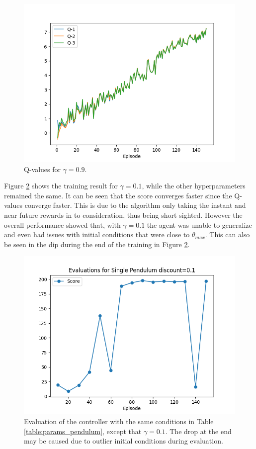 \documentclass{LTHtwocol} %
\begin{document}
\begin{figure}[H]
	\centering
	\includegraphics[width=0.9\columnwidth]{figures/Pendulum_q_gamma_09.png}
	\caption{Q-values for $\gamma=0.9$.}
	\label{fig:pendulum_gamma_09}
\end{figure}

Figure \ref{fig:single_pendulum_eval_01} shows the training result for $\gamma=0.1$, while the other hyperparameters remained the same. It can be seen that the score converges faster since the Q-values converge faster. This is due to the algorithm only taking the instant and near future rewards in to consideration, thus being short sighted. However the overall performance showed that, with $\gamma=0.1$ the agent was unable to generalize and even had issues with initial conditions that were close to $\theta_{max}$. This can also be seen in the dip during the end of the training in Figure \ref{fig:single_pendulum_eval_01}.
\begin{figure}[H]
	\centering
	\includegraphics[width=0.9\columnwidth]{figures/pendulum_gamma_01.png}
	\caption{Evaluation of the controller with the same conditions in Table \ref{table:params_pendulum}, except that $\gamma=0.1$. The drop at the end may be caused due to outlier initial conditions during evaluation.}
	\label{fig:single_pendulum_eval_01}
\end{figure}
\end{document}
